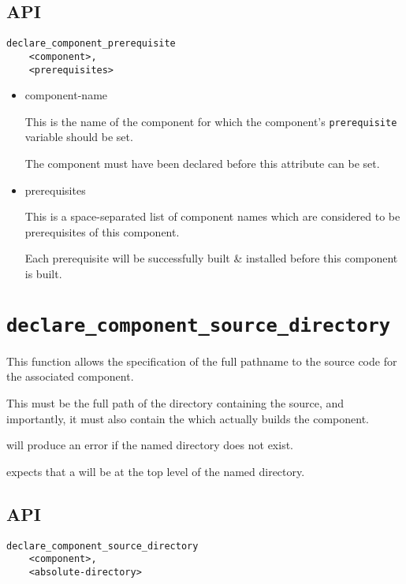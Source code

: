 \subsection{API}

\begin{verbatim}
declare_component_prerequisite
    <component>,
    <prerequisites>
\end{verbatim}

\begin{itemize}
\item component-name

  This is the name of the component for which the component's
  \texttt{prerequisite} variable should be set.

  The component must have been declared before this attribute can be
  set.

\item prerequisites

  This is a space-separated list of component names which are
  considered to be prerequisites of this component.

  Each prerequisite will be successfully built \& installed before
  this component is built.
\end{itemize}

\section{\texttt{declare\_component\_source\_directory}}\label{api:source-directory}

This function allows the specification of the full pathname to the
source code for the associated component.

This must be the full path of the directory containing the source, and
importantly, it must also contain the \makefile which actually builds
the component.

\lmsbw will produce an error if the named directory does not exist.

\lmsbw expects that a \makefile will be at the top level of the named
directory.

\subsection{API}

\begin{verbatim}
declare_component_source_directory
    <component>,
    <absolute-directory>
\end{verbatim}

